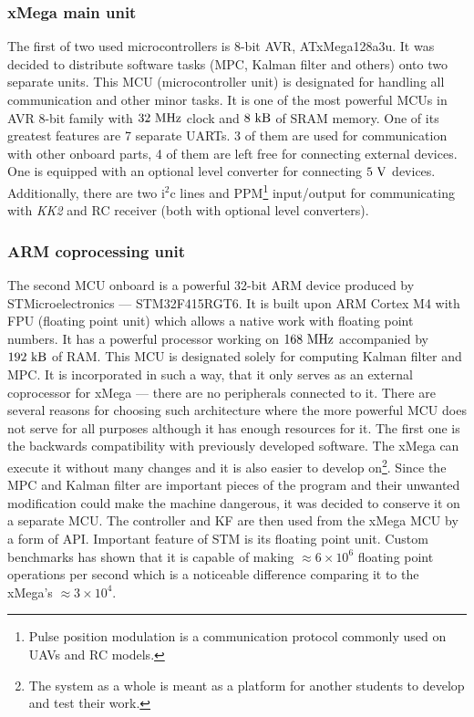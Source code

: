 \subsubsection{xMega main unit}

The first of two used microcontrollers is 8-bit AVR, ATxMega128a3u. It was decided to distribute software tasks (MPC, Kalman filter and others) onto two separate units. This MCU (microcontroller unit) is designated for handling all communication and other minor tasks. It is one of the most powerful MCUs in AVR 8-bit family with $32 ~\mathrm{MHz}$ clock and $8 ~\mathrm{kB}$ of SRAM memory. One of its greatest features are 7 separate UARTs. 3 of them are used for communication with other onboard parts, 4 of them are left free for connecting external devices. One is equipped with an optional level converter for connecting $5 ~\mathrm{V}$ devices. Additionally, there are two $\mathrm{i}^2\mathrm{c}$ lines and PPM\footnote{Pulse position modulation is a communication protocol commonly used on UAVs and RC models.} input/output for communicating with \textit{KK2} and RC receiver (both with optional level converters).

\subsubsection{ARM coprocessing unit}

The second MCU onboard is a powerful 32-bit ARM device produced by STMicroelectronics --- STM32F415RGT6. It is built upon ARM Cortex M4 with FPU (floating point unit) which allows a native work with floating point numbers. It has a powerful processor working on $168 ~\mathrm{MHz}$ accompanied by $192 ~\mathrm{kB}$ of RAM. This MCU is designated solely for computing Kalman filter and MPC. It is incorporated in such a way, that it only serves as an external coprocessor for xMega --- there are no peripherals connected to it. There are several reasons for choosing such architecture where the more powerful MCU does not serve for all purposes although it has enough resources for it. The first one is the backwards compatibility with previously developed software. The xMega can execute it without many changes and it is also easier to develop on\footnote{The system as a whole is meant as a platform for another students to develop and test their work.}. Since the MPC and Kalman filter are important pieces of the program and their unwanted modification could make the machine dangerous, it was decided to conserve it on a separate MCU. The controller and KF are then used from the xMega MCU by a form of API. Important feature of STM is its floating point unit. Custom benchmarks has shown that it is capable of making $\approx 6 \times 10^6$ floating point operations per second which is a noticeable  difference comparing it to the xMega's $\approx 3\times 10^4$.

